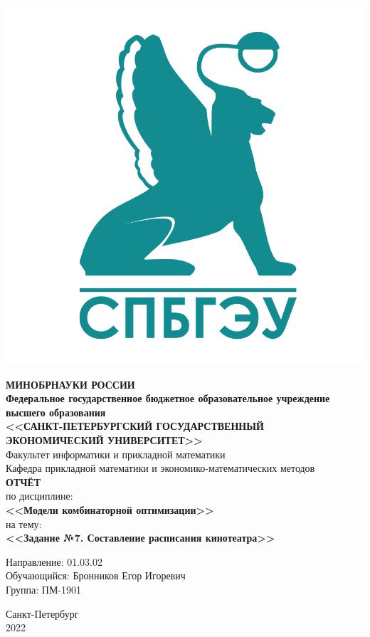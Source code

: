 \documentclass[14pt,fleqn]{extarticle}
\begin{document}
	\begin{titlepage}
		\includegraphics[scale=0.12]{logo}
		\begin{center}
			\textbf{МИНОБРНАУКИ РОССИИ}\\
			\vspace{0.2cm}
			\textbf{Федеральное государственное бюджетное образовательное учреждение высшего образования}\\
			\textbf{<<САНКТ-ПЕТЕРБУРГСКИЙ ГОСУДАРСТВЕННЫЙ ЭКОНОМИЧЕСКИЙ УНИВЕРСИТЕТ>>}\\
			\vspace{0.6cm}
			Факультет информатики и прикладной математики\\
			Кафедра прикладной математики и экономико-математических методов\\
			\vspace{1cm}
			\textbf{ОТЧЁТ}\\
			по дисциплине:\\
			\textbf{<<Модели комбинаторной оптимизации>>}\\
			на тему:\\
			\textbf{<<Задание №7. Составление расписания кинотеатра>>}\\
		\end{center}
		\vspace{1cm}
		Направление: 01.03.02\\
		Обучающийся: Бронников Егор Игоревич\\
		Группа: ПМ-1901\\
		\vfill
		\begin{center}
			Санкт-Петербург\\
			2022\\
		\end{center}
	\end{titlepage}
\end{document}
